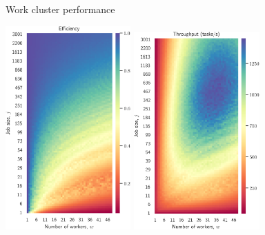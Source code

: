 \documentclass[aspectratio=1610]{beamer}
\newcommand{\backupend}{
  \addtocounter{framenumberappendix}{-\value{framenumber}}
  \addtocounter{framenumber}{\value{framenumberappendix}} 
}
\begin{document}
\begin{frame}{Work cluster performance}
  \begin{center}
    \includegraphics[width=0.36\textwidth]{../assets/worker-efficiency.png}
    \hfill
    \includegraphics[width=0.36\textwidth]{../assets/worker-throughput.png}
  \end{center}
\end{frame}

    

\backupend
\end{document}
